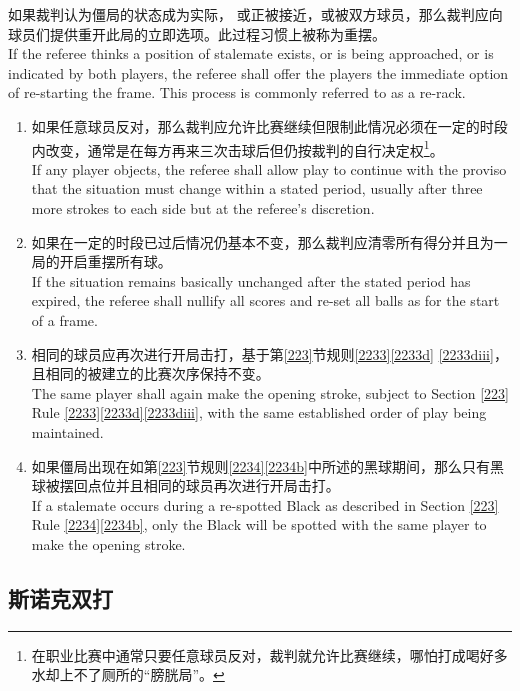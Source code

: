 \noindent 如果裁判认为僵局的状态成为实际， 或正被接近，或被双方球员\indicate{}，那么裁判应向球员们提供重开此局的立即选项。此过程习惯上被称为重摆。\\
If the referee thinks a position of stalemate exists, or is being approached, or is indicated by both players, the referee shall offer the players the immediate option of re-starting the frame. This process is commonly referred to as a re-rack.
\begin{enumerate}[label=(\alph*)]
    \item 如果任意球员反对，那么裁判应允许比赛继续但限制此情况必须在一定的时段内改变，通常是在每方再来三次击球后但仍按裁判的自行决定权\footnote{在职业比赛中通常只要任意球员反对，裁判就允许比赛继续，哪怕打成喝好多水却上不了厕所的“膀胱局”。}。\\
    If any player objects, the referee shall allow play to continue with the proviso that the situation must change within a stated period, usually after three more strokes to each side but at the referee's discretion.
    \item 如果在一定的时段已过后情况仍基本不变，那么裁判应清零所有得分并且为一局的开启重摆所有球。\\
    If the situation remains basically unchanged after the stated period has expired, the referee shall nullify all scores and re-set all balls as for the start of a frame.
    \item 相同的球员应再次进行开局击打，基于第\ref{223}节规则\ref{2233}\ref{2233d} \ref{2233diii}，且相同的被建立的比赛次序保持不变。\\
    The same player shall again make the opening stroke, subject to Section \ref{223} Rule \ref{2233}\ref{2233d}\ref{2233diii}, with the same established order of play being maintained.
    \item 如果僵局出现在如第\ref{223}节规则\ref{2234}\ref{2234b}中所述的\respotted{}黑球期间，那么只有黑球被摆回点位并且相同的球员再次进行开局击打。\\
    If a stalemate occurs during a re-spotted Black as described in Section \ref{223} Rule \ref{2234}\ref{2234b}, only the Black will be spotted with the same player to make the opening stroke.
\end{enumerate}

\subsection{斯诺克双打}\label{22318}

